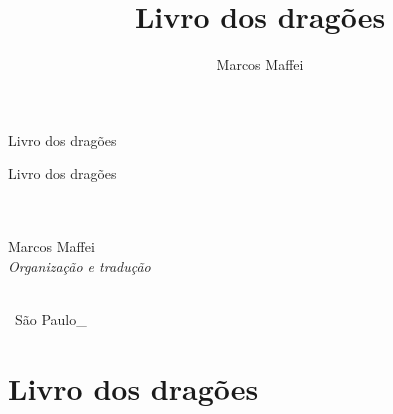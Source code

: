 \documentclass[showtrims,12pt]{memoir}
\author{Marcos Maffei}
\title{Livro dos dragões}
\begin{document}
\fontsize{12pt}{15.6pt}\selectfont

{\huge\centering\vspace*{6em}\thispagestyle{empty}
Livro dos dragões\par}

\cleardoublepage

{\huge\centering\vspace*{6em}\thispagestyle{empty}
Livro dos dragões\\\bigskip

\vfill{\large\ \\%
\normalsize\textit{\ }\\\bigskip
\large Marcos Maffei\\%
\normalsize\textit{Organização e tradução}\\\vspace*{4em}}

\logoum\\
{\normalsize\ São Paulo\_\the\year}\par}

\clearpage



\clearpage

\setcounter{tocdepth}{0}
\setcounter{secnumdepth}{-2}

\renewcommand{\contentsname}{Sumário\vspace*{-1em}}
\tableofcontents*

\clearpage

\pagestyle{estilo}

\part{Livro dos dragões}





\end{document}
